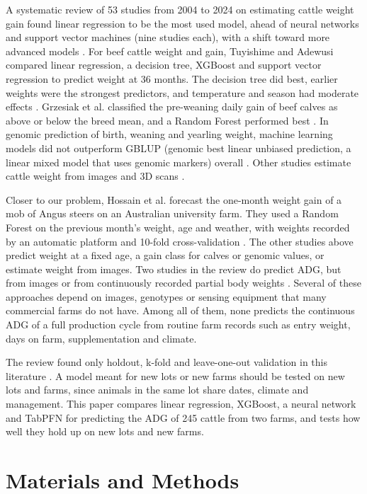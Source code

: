 \documentclass[runningheads]{llncs}
\begin{document}
A systematic review of 53 studies from 2004 to 2024 on estimating cattle weight gain found linear regression to be the most used model, ahead of neural networks and support vector machines (nine studies each), with a shift toward more advanced models \cite{hossain2025review}. For beef cattle weight and gain, Tuyishime and Adewusi compared linear regression, a decision tree, XGBoost and support vector regression to predict weight at 36 months. The decision tree did best, earlier weights were the strongest predictors, and temperature and season had moderate effects \cite{tuyishime2025}. Grzesiak et al. classified the pre-weaning daily gain of beef calves as above or below the breed mean, and a Random Forest performed best \cite{grzesiak2023}. In genomic prediction of birth, weaning and yearling weight, machine learning models did not outperform GBLUP (genomic best linear unbiased prediction, a linear mixed model that uses genomic markers) overall \cite{hay2024}. Other studies estimate cattle weight from images and 3D scans \cite{gebreyesus2023,afridi2024,xu2024}.

Closer to our problem, Hossain et al. forecast the one-month weight gain of a mob of Angus steers on an Australian university farm. They used a Random Forest on the previous month's weight, age and weather, with weights recorded by an automatic platform and 10-fold cross-validation \cite{hossain2025mob}. The other studies above predict weight at a fixed age, a gain class for calves or genomic values, or estimate weight from images. Two studies in the review do predict ADG, but from images \cite{cominotte2020} or from continuously recorded partial body weights \cite{macneil2021}. Several of these approaches depend on images, genotypes or sensing equipment that many commercial farms do not have. Among all of them, none predicts the continuous ADG of a full production cycle from routine farm records such as entry weight, days on farm, supplementation and climate.

The review found only holdout, k-fold and leave-one-out validation in this literature \cite{hossain2025review}. A model meant for new lots or new farms should be tested on new lots and farms, since animals in the same lot share dates, climate and management. This paper compares linear regression, XGBoost, a neural network and TabPFN for predicting the ADG of 245 cattle from two farms, and tests how well they hold up on new lots and new farms.

\section{Materials and Methods}
\end{document}
